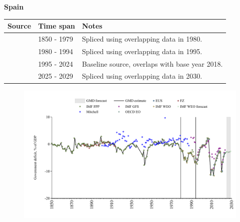 \documentclass[12pt,a4paper,landscape]{article}
\begin{document}
\begin{adjustbox}{max totalsize={\paperwidth}{\paperheight},center}
\begin{minipage}[t][\textheight][t]{\textwidth}
\vspace*{0.5cm}
{}
\begin{center}
{\Large\bfseries Spain}
\end{center}
\vspace{0.5cm}
\begin{table}[H]
\centering
\small
\begin{tabular}{|l|l|l|}
\hline
\textbf{Source} & \textbf{Time span} & \textbf{Notes} \\
\hline
\rowcolor{white}\cite{IMF_FPP}& 1850 - 1979 &Spliced using overlapping data in 1980.\\
\rowcolor{lightgray}\cite{IMF_WEO}& 1980 - 1994 &Spliced using overlapping data in 1995.\\
\rowcolor{white}\cite{EUS}& 1995 - 2024 &Baseline source, overlaps with base year 2018.\\
\rowcolor{lightgray}\cite{IMF_WEO_forecast}& 2025 - 2029 &Spliced using overlapping data in 2030.\\
\hline
\end{tabular}
\end{table}
\begin{figure}[H]
\centering
\includegraphics[width=\textwidth,height=0.6\textheight,keepaspectratio]{graphs/ESP_govdef_GDP.pdf}
\end{figure}
\end{minipage}
\end{adjustbox}
\end{document}
